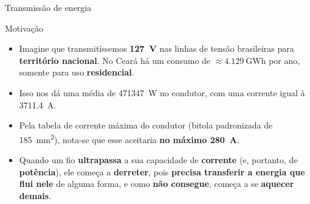 %
%	


\begin{frame}{Transmissão de energia}
	\begin{block}{Motivação}
		\begin{itemize}
			\item Imagine que transmitíssemos \textbf{\SI{127}{\volt}} nas linhas de tensão brasileiras para \textbf{território nacional}. No Ceará há um consumo de $ \approx \SI{4.129}{\giga\watt\hour} $ por ano, somente para uso \textbf{residencial}.
			\item Isso nos dá uma média de \SI{471347}{\watt} no condutor, com uma corrente igual à \SI{3711.4}{\ampere}.
			\item Pela tabela de corrente máxima do condutor (bitola padronizada de \SI{185}{\milli\meter\squared}), nota-se que esse aceitaria \textbf{no máximo \SI{280}{\ampere}}.
			\item Quando um fio \textbf{ultrapassa} a sua capacidade de \textbf{corrente} (e, portanto, de \textbf{potência}), ele começa a \textbf{derreter}, pois \textbf{precisa transferir a energia que flui nele} de alguma forma, e como \textbf{não consegue}, começa a se \textbf{aquecer demais}.
		\end{itemize}
	\end{block}


\end{frame}


